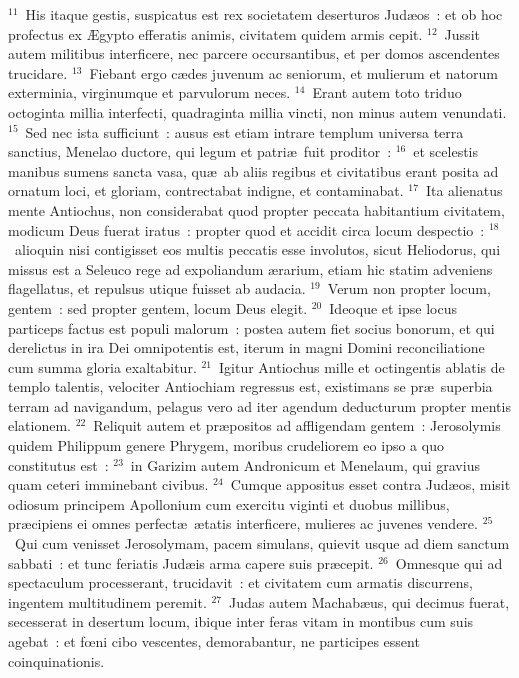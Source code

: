 ${}^{11}$~His itaque gestis, suspicatus est rex societatem deserturos Jud\ae os~: et ob hoc profectus ex \AE gypto efferatis animis, civitatem quidem armis cepit.
${}^{12}$~Jussit autem militibus interficere, nec parcere occursantibus, et per domos ascendentes trucidare.
${}^{13}$~Fiebant ergo c\ae des juvenum ac seniorum, et mulierum et natorum exterminia, virginumque et parvulorum neces.
${}^{14}$~Erant autem toto triduo octoginta millia interfecti, quadraginta millia vincti, non minus autem venundati.
${}^{15}$~Sed nec ista sufficiunt~: ausus est etiam intrare templum universa terra sanctius, Menelao ductore, qui legum et patri\ae\ fuit proditor~:
${}^{16}$~et scelestis manibus sumens sancta vasa, qu\ae\ ab aliis regibus et civitatibus erant posita ad ornatum loci, et gloriam, contrectabat indigne, et contaminabat.
${}^{17}$~Ita alienatus mente Antiochus, non considerabat quod propter peccata habitantium civitatem, modicum Deus fuerat iratus~: propter quod et accidit circa locum despectio~:
${}^{18}$~alioquin nisi contigisset eos multis peccatis esse involutos, sicut Heliodorus, qui missus est a Seleuco rege ad expoliandum \ae rarium, etiam hic statim adveniens flagellatus, et repulsus utique fuisset ab audacia.
${}^{19}$~Verum non propter locum, gentem~: sed propter gentem, locum Deus elegit.
${}^{20}$~Ideoque et ipse locus particeps factus est populi malorum~: postea autem fiet socius bonorum, et qui derelictus in ira Dei omnipotentis est, iterum in magni Domini reconciliatione cum summa gloria exaltabitur.
${}^{21}$~Igitur Antiochus mille et octingentis ablatis de templo talentis, velociter Antiochiam regressus est, existimans se pr\ae\ superbia terram ad navigandum, pelagus vero ad iter agendum deducturum propter mentis elationem.
${}^{22}$~Reliquit autem et pr\ae positos ad affligendam gentem~: Jerosolymis quidem Philippum genere Phrygem, moribus crudeliorem eo ipso a quo constitutus est~:
${}^{23}$~in Garizim autem Andronicum et Menelaum, qui gravius quam ceteri imminebant civibus.
${}^{24}$~Cumque appositus esset contra Jud\ae os, misit odiosum principem Apollonium cum exercitu viginti et duobus millibus, pr\ae cipiens ei omnes perfect\ae\ \ae tatis interficere, mulieres ac juvenes vendere.
${}^{25}$~Qui cum venisset Jerosolymam, pacem simulans, quievit usque ad diem sanctum sabbati~: et tunc feriatis Jud\ae is arma capere suis pr\ae cepit.
${}^{26}$~Omnesque qui ad spectaculum processerant, trucidavit~: et civitatem cum armatis discurrens, ingentem multitudinem peremit.
${}^{27}$~Judas autem Machab\ae us, qui decimus fuerat, secesserat in desertum locum, ibique inter feras vitam in montibus cum suis agebat~: et fœni cibo vescentes, demorabantur, ne participes essent coinquinationis.

